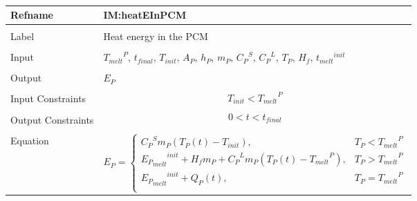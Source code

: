 \documentclass[12pt]{article}
\begin{document}
\begin{minipage}{\textwidth}
\end{minipage}
\par~

\noindent \begin{minipage}{\textwidth}
\begin{tabular}{>{\raggedright}p{}>{\raggedright\arraybackslash}p{}}
\toprule \textbf{Refname} & \textbf{IM:heatEInPCM}
\label{IM:heatEInPCM}
\\ \midrule \\
Label & Heat energy in the PCM
\\ \midrule \\
Input & ${{T_{melt}}^{P}}$, ${t_{final}}$, ${T_{init}}$, ${A_{P}}$, ${h_{P}}$, ${m_{P}}$, ${{C_{P}}^{S}}$, ${{C_{P}}^{L}}$, ${T_{P}}$, ${H_{f}}$, ${{t_{melt}}^{init}}$
\\ \midrule \\
Output & ${E_{P}}$
\\ \midrule \\
Input Constraints & \begin{displaymath}
                    {T_{init}}<{{T_{melt}}^{P}}
                    \end{displaymath}
\\ \midrule \\
Output Constraints & \begin{displaymath}
                     0<t<{t_{final}}
                     \end{displaymath}
\\ \midrule \\
Equation & \begin{displaymath}
           {E_{P}}=\begin{cases}
{{C_{P}}^{S}} {m_{P}} \left({T_{P}}\left(t\right)-{T_{init}}\right), & {T_{P}}<{{T_{melt}}^{P}}\\
{{{E_{P}}_{melt}}^{init}}+{H_{f}} {m_{P}}+{{C_{P}}^{L}} {m_{P}} \left({T_{P}}\left(t\right)-{{T_{melt}}^{P}}\right), & {T_{P}}>{{T_{melt}}^{P}}\\
{{{E_{P}}_{melt}}^{init}}+{Q_{P}}\left(t\right), & {T_{P}}={{T_{melt}}^{P}}\\

\end{cases}
\end{displaymath}
\end{tabular}
\end{minipage}
\end{document}
